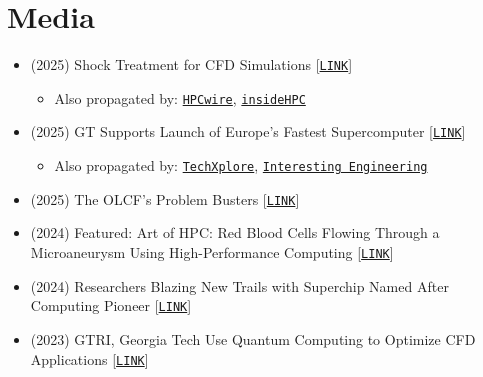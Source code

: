 \section{Media}

\begin{itemize}
    \item (2025) Shock Treatment for CFD Simulations [\href{https://www.olcf.ornl.gov/2025/07/23/shock-treatment-for-cfd-simulations/}{\tt LINK}]
    \begin{itemize}
        \item Also propagated by: \href{https://www.hpcwire.com/off-the-wire/oak-ridge-and-georgia-tech-push-frontier-to-new-scale-for-cfd-research/}{\tt HPCwire}, \href{https://insidehpc.com/2025/07/oak-ridge-reports-largest-cfd-simulation-achieved-on-frontier/}{\tt insideHPC}
    \end{itemize}

    \item (2025) GT Supports Launch of Europe's Fastest Supercomputer [\href{https://www.cc.gatech.edu/news/pancaked-water-droplets-help-launch-europes-fastest-supercomputer}{\tt LINK}]
    \begin{itemize}
        \item Also propagated by: \href{https://techxplore.com/news/2025-07-pancaked-droplets-europe-fastest-supercomputer.html}{\tt TechXplore}, \href{https://interestingengineering.com/innovation/europes-newly-launched-and-fastest-supercomputer}{\tt Interesting Engineering}
    \end{itemize}

    \item (2025) The OLCF's Problem Busters [\href{https://www.olcf.ornl.gov/2025/02/11/the-olcfs-problem-busters/}{\tt LINK}]

    \item (2024) Featured: Art of HPC: Red Blood Cells Flowing Through a Microaneurysm Using High-Performance Computing [\href{https://sites.gatech.edu/research/sc-2024://sites.gatech.edu/research/sc-2024/}{\tt LINK}]

    \item (2024) Researchers Blazing New Trails with Superchip Named After Computing Pioneer [\href{https://www.cc.gatech.edu/news/researchers-blazing-new-trails-superchip-named-after-computing-pioneer}{\tt LINK}] 

    \item (2023) GTRI, Georgia Tech Use Quantum Computing to Optimize CFD Applications
 [\href{https://gtri.gatech.edu/newsroom/gtri-georgia-tech-use-quantum-computing-optimize-cfd-applications}{\tt LINK}]


\end{itemize}
